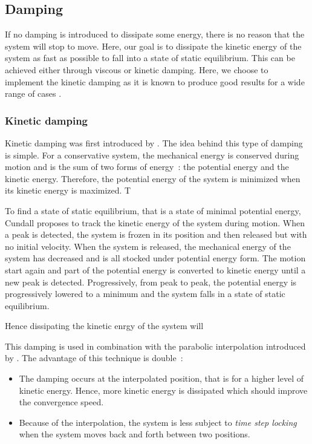 \subsection{Damping}
If no damping is introduced to dissipate some energy, there is no reason that the system will stop to move. Here, our goal is to dissipate the kinetic energy of the system as fast as possible to fall into a state of static equilibrium. This can be achieved either through viscous or kinetic damping. Here, we choose to implement the kinetic damping as it is known to produce good results for a wide range of cases \cite{Rezaiee2012}.

\subsubsection{Kinetic damping}
Kinetic damping was first introduced by . The idea behind this type of damping is simple. For a conservative system, the mechanical energy is conserved during motion and is the sum of two forms of energy~: the potential energy and the kinetic energy. Therefore, the potential energy of the system is minimized when its kinetic energy is maximized. T

To find a state of static equilibrium, that is a state of minimal potential energy, Cundall proposes to track the kinetic energy of the system during motion. When a peak is detected, the system is frozen in its position and then released but with no initial velocity. When the system is released, the mechanical energy of the system has decreased and is all stocked under potential energy form. The motion start again and part of the potential energy is converted to kinetic energy until a new peak is detected. Progressively, from peak to peak, the potential energy is progressively lowered to a minimum and the system falls in a state of static equilibrium. 


Hence dissipating the kinetic enrgy of the system will 

This damping is used in combination with the parabolic interpolation introduced by . The advantage of this technique is double~:
\begin{itemize}
\item The damping occurs at the interpolated position, that is for a higher level of kinetic energy. Hence, more kinetic energy is dissipated which should improve the convergence speed.
\item Because of the interpolation, the system is less subject to \emph{time step locking} when the system moves back and forth between two positions.
\end{itemize}

